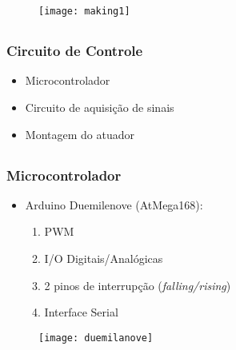\documentclass{beamer}
\begin{document}
\begin{frame}[plain]
 \begin{figure}
   \begin{center}
    \texttt{[image: making1]}
  \end{center}
 \end{figure}
\end{frame}

\subsection{}
\begin{frame}
 \frametitle{Circuito de Controle}
  \begin{itemize}
    \item Microcontrolador
    \item Circuito de aquisição de sinais
    \item Montagem do atuador
  \end{itemize}
\end{frame}

\subsection{}
\begin{frame}
  \frametitle{Microcontrolador}
  \begin{itemize}
  \item Arduino Duemilenove (AtMega168):
    \begin{enumerate}
      \item PWM
      \item I/O Digitais/Analógicas
      \item 2 pinos de interrupção (\textit{falling/rising})
      \item Interface Serial
    \end{enumerate}
  \end{itemize}
\begin{figure}[h]
\begin{center}
 \texttt{[image: duemilanove]}
\end{center}
\end{figure}
\end{frame}
\end{document}
